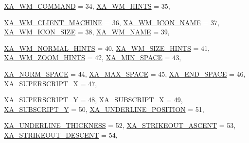 \begin{DoxyCompactItemize}
\hyperlink{namespace_tao_1_1_platform_1_1_x11_a9042a68c2a3fd29002b5ad9d26f5776a}{XA\_\-WM\_\-COMMAND} =  34, 
\hyperlink{namespace_tao_1_1_platform_1_1_x11_a9042a68c2a3fd29002b5ad9d26f5776a}{XA\_\-WM\_\-HINTS} =  35, 
\par
\hyperlink{namespace_tao_1_1_platform_1_1_x11_a9042a68c2a3fd29002b5ad9d26f5776a}{XA\_\-WM\_\-CLIENT\_\-MACHINE} =  36, 
\hyperlink{namespace_tao_1_1_platform_1_1_x11_a9042a68c2a3fd29002b5ad9d26f5776a}{XA\_\-WM\_\-ICON\_\-NAME} =  37, 
\hyperlink{namespace_tao_1_1_platform_1_1_x11_a9042a68c2a3fd29002b5ad9d26f5776a}{XA\_\-WM\_\-ICON\_\-SIZE} =  38, 
\hyperlink{namespace_tao_1_1_platform_1_1_x11_a9042a68c2a3fd29002b5ad9d26f5776a}{XA\_\-WM\_\-NAME} =  39, 
\par
\hyperlink{namespace_tao_1_1_platform_1_1_x11_a9042a68c2a3fd29002b5ad9d26f5776a}{XA\_\-WM\_\-NORMAL\_\-HINTS} =  40, 
\hyperlink{namespace_tao_1_1_platform_1_1_x11_a9042a68c2a3fd29002b5ad9d26f5776a}{XA\_\-WM\_\-SIZE\_\-HINTS} =  41, 
\hyperlink{namespace_tao_1_1_platform_1_1_x11_a9042a68c2a3fd29002b5ad9d26f5776a}{XA\_\-WM\_\-ZOOM\_\-HINTS} =  42, 
\hyperlink{namespace_tao_1_1_platform_1_1_x11_a9042a68c2a3fd29002b5ad9d26f5776a}{XA\_\-MIN\_\-SPACE} =  43, 
\par
\hyperlink{namespace_tao_1_1_platform_1_1_x11_a9042a68c2a3fd29002b5ad9d26f5776a}{XA\_\-NORM\_\-SPACE} =  44, 
\hyperlink{namespace_tao_1_1_platform_1_1_x11_a9042a68c2a3fd29002b5ad9d26f5776a}{XA\_\-MAX\_\-SPACE} =  45, 
\hyperlink{namespace_tao_1_1_platform_1_1_x11_a9042a68c2a3fd29002b5ad9d26f5776a}{XA\_\-END\_\-SPACE} =  46, 
\hyperlink{namespace_tao_1_1_platform_1_1_x11_a9042a68c2a3fd29002b5ad9d26f5776a}{XA\_\-SUPERSCRIPT\_\-X} =  47, 
\par
\hyperlink{namespace_tao_1_1_platform_1_1_x11_a9042a68c2a3fd29002b5ad9d26f5776a}{XA\_\-SUPERSCRIPT\_\-Y} =  48, 
\hyperlink{namespace_tao_1_1_platform_1_1_x11_a9042a68c2a3fd29002b5ad9d26f5776a}{XA\_\-SUBSCRIPT\_\-X} =  49, 
\hyperlink{namespace_tao_1_1_platform_1_1_x11_a9042a68c2a3fd29002b5ad9d26f5776a}{XA\_\-SUBSCRIPT\_\-Y} =  50, 
\hyperlink{namespace_tao_1_1_platform_1_1_x11_a9042a68c2a3fd29002b5ad9d26f5776a}{XA\_\-UNDERLINE\_\-POSITION} =  51, 
\par
\hyperlink{namespace_tao_1_1_platform_1_1_x11_a9042a68c2a3fd29002b5ad9d26f5776a}{XA\_\-UNDERLINE\_\-THICKNESS} =  52, 
\hyperlink{namespace_tao_1_1_platform_1_1_x11_a9042a68c2a3fd29002b5ad9d26f5776a}{XA\_\-STRIKEOUT\_\-ASCENT} =  53, 
\hyperlink{namespace_tao_1_1_platform_1_1_x11_a9042a68c2a3fd29002b5ad9d26f5776a}{XA\_\-STRIKEOUT\_\-DESCENT} =  54, 

\end{DoxyCompactItemize}
